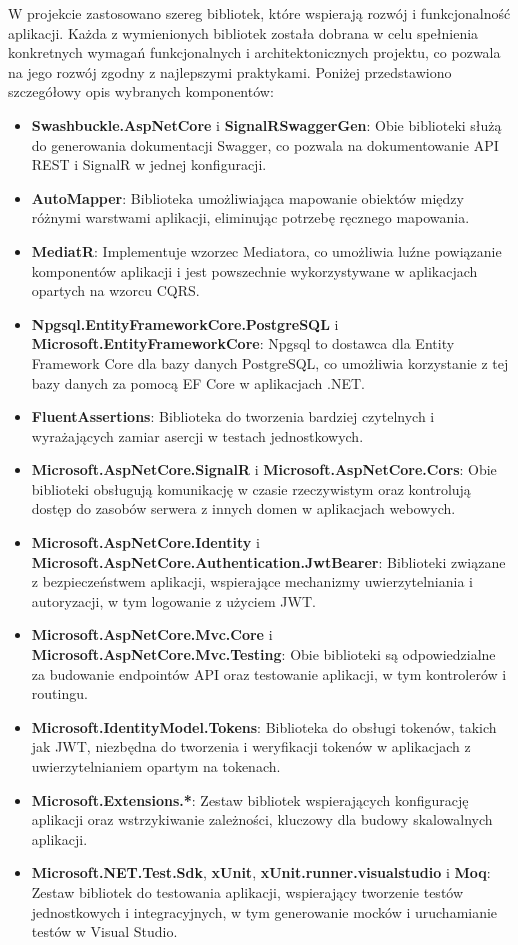 \documentclass[12pt,a4paper]{article}
\begin{document}
W projekcie zastosowano szereg bibliotek, które wspierają rozwój i funkcjonalność aplikacji. Każda z wymienionych bibliotek została dobrana w celu spełnienia konkretnych wymagań funkcjonalnych i architektonicznych projektu, co pozwala na jego rozwój zgodny z najlepszymi praktykami. Poniżej przedstawiono szczegółowy opis wybranych komponentów:
\begin{itemize} 
    \item \textbf{Swashbuckle.AspNetCore} i \textbf{SignalRSwaggerGen}: Obie biblioteki służą do generowania dokumentacji Swagger, co pozwala na dokumentowanie API REST i SignalR w jednej konfiguracji. 
    \item \textbf{AutoMapper}: Biblioteka umożliwiająca mapowanie obiektów między różnymi warstwami aplikacji, eliminując potrzebę ręcznego mapowania. 
    \item \textbf{MediatR}: Implementuje wzorzec Mediatora, co umożliwia luźne powiązanie komponentów aplikacji i jest powszechnie wykorzystywane w aplikacjach opartych na wzorcu CQRS. 
    \item \textbf{Npgsql.EntityFrameworkCore.PostgreSQL} i \textbf{Microsoft.EntityFrameworkCore}: Npgsql to dostawca dla Entity Framework Core dla bazy danych PostgreSQL, co umożliwia korzystanie z tej bazy danych za pomocą EF Core w aplikacjach .NET. 
    \item \textbf{FluentAssertions}: Biblioteka do tworzenia bardziej czytelnych i wyrażających zamiar asercji w testach jednostkowych. 
    \item \textbf{Microsoft.AspNetCore.SignalR} i \textbf{Microsoft.AspNetCore.Cors}: Obie biblioteki obsługują komunikację w czasie rzeczywistym oraz kontrolują dostęp do zasobów serwera z innych domen w aplikacjach webowych. 
    \item \textbf{Microsoft.AspNetCore.Identity} i \textbf{Microsoft.AspNetCore.Authentication.JwtBearer}: Biblioteki związane z bezpieczeństwem aplikacji, wspierające mechanizmy uwierzytelniania i autoryzacji, w tym logowanie z użyciem JWT. 
    \item \textbf{Microsoft.AspNetCore.Mvc.Core} i \textbf{Microsoft.AspNetCore.Mvc.Testing}: Obie biblioteki są odpowiedzialne za budowanie endpointów API oraz testowanie aplikacji, w tym kontrolerów i routingu. 
    \item \textbf{Microsoft.IdentityModel.Tokens}: Biblioteka do obsługi tokenów, takich jak JWT, niezbędna do tworzenia i weryfikacji tokenów w aplikacjach z uwierzytelnianiem opartym na tokenach. 
    \item \textbf{Microsoft.Extensions.*}: Zestaw bibliotek wspierających konfigurację aplikacji oraz wstrzykiwanie zależności, kluczowy dla budowy skalowalnych aplikacji.
    \item \textbf{Microsoft.NET.Test.Sdk}, \textbf{xUnit}, \textbf{xUnit.runner.visualstudio} i \textbf{Moq}: Zestaw bibliotek do testowania aplikacji, wspierający tworzenie testów jednostkowych i integracyjnych, w tym generowanie mocków i uruchamianie testów w Visual Studio. 
\end{itemize}
\end{document}
